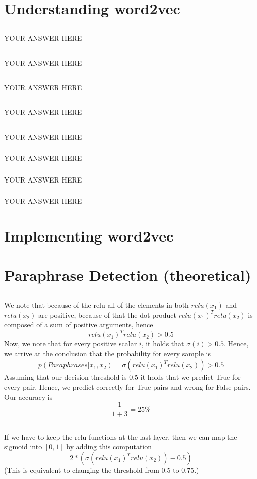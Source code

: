\documentclass{article}
\begin{document}
\section{Understanding word2vec}
\subsection{}
YOUR ANSWER HERE
\subsection{}
YOUR ANSWER HERE
\subsection{}
YOUR ANSWER HERE
\subsection{}
YOUR ANSWER HERE
\subsection{}
YOUR ANSWER HERE
\subsubsection{}
YOUR ANSWER HERE
\subsubsection{}
YOUR ANSWER HERE
\subsubsection{}
YOUR ANSWER HERE
\section{Implementing word2vec}
\setcounter{subsection}{4}
\subsection{}


\section{Paraphrase Detection (theoretical)}
\subsection{}
We note that because of the relu all of the elements in both $relu(x_1)$ and $relu(x_2)$ are positive, 
because of that the dot product $relu(x_1)^T relu(x_2)$ is composed of a sum of positive arguments, hence 
$$relu(x_1)^T relu(x_2) > 0.5$$
Now, we note that for every positive scalar $i$, it holds that $\sigma (i) > 0.5$. Hence, we arrive at the conclusion that the probability for every sample is
$$p(Paraphrases|x_1, x_2) = \sigma (relu(x_1)^T relu(x_2)) > 0.5$$
Assuming that our decision threshold is $0.5$ it holds that we predict True for every pair.
Hence, we predict correctly for True pairs and wrong for False pairs. Our accuracy is 
$$\frac{1}{1+3}=25 \% $$
\subsection{}
If we have to keep the relu functions at the last layer, then we can map the sigmoid into $[0,1]$ by adding this computation
$$2*(\sigma (relu(x_1)^T relu(x_2)) - 0.5)$$
(This is equivalent to changing the threshold from 0.5 to 0.75.)
\end{document}
